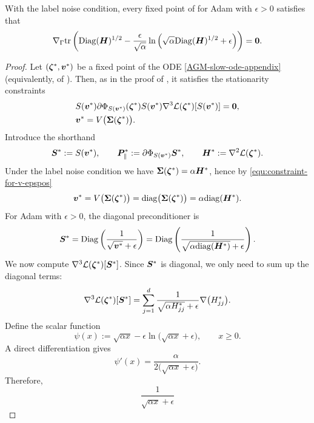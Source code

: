 \begin{lemma}\label{lemma:adam-implicit-bias-label-noise-eps-not-0}
    With the label noise condition, every fixed point of  for Adam with $\epsilon > 0$ satisfies that
    $$\nabla_{\Gamma} \text{tr}\left( \mathrm{Diag}({\bm{H}})^{1/2} - \frac{\epsilon}{\sqrt{\alpha}} \ln\left(\sqrt{\alpha}\mathrm{Diag}({\bm{H}})^{1/2} + \epsilon\right) \right) = {\bm{0}}.$$\label{thm:formal-adam-implicit-bias-label-noise-eps-not-0}
\end{lemma}
\begin{proof}
    Let $({\bm{\zeta}}^*,{\bm{v}}^*)$ be a fixed point of the ODE \eqref{AGM-slow-ode-appendix} (equivalently, of ). Then, as in the proof of , it satisfies the stationarity constraints
    \begin{align}
        &S({\bm{v}}^*) \partial\Phi_{S({\bm{v}}^*)} ({\bm{\zeta}}^*)  S({\bm{v}}^*)  \nabla^3 \mathcal{L} ({\bm{\zeta}}^*)[S({\bm{v}}^*)]={\bm{0}}, \label{equ:constraint-for-Phi-epspos}\\
        &{\bm{v}}^* = V\big({\bm{\Sigma}}({\bm{\zeta}}^*)\big). \label{equ:constraint-for-v-epspos}
    \end{align}
    Introduce the shorthand
    \[
        {\bm{S}}^* := S({\bm{v}}^*),\qquad
        {\bm{P}}^*_{\parallel}:=\partial \Phi_{S({\bm{v}}^*)}{\bm{S}}^*,\qquad
        {\bm{H}}^* := \nabla^2 \mathcal{L}({\bm{\zeta}}^*).
    \]
    Under the label noise condition we have ${\bm{\Sigma}}({\bm{\zeta}}^*)=\alpha{\bm{H}}^*$, hence by \eqref{equ:constraint-for-v-epspos}
    \[
        {\bm{v}}^* = V\big({\bm{\Sigma}}({\bm{\zeta}}^*)\big) = \mathrm{diag}\big({\bm{\Sigma}}({\bm{\zeta}}^*)\big)
        = \alpha\mathrm{diag}({\bm{H}}^*).
    \]
    For Adam with $\epsilon>0$, the diagonal preconditioner is
    \[
        {\bm{S}}^* = \mathrm{Diag}\left(\frac{1}{\sqrt{{\bm{v}}^*}+\epsilon}\right)
        = \mathrm{Diag}\left(\frac{1}{\sqrt{\alpha\mathrm{diag}({\bm{H}}^*)}+\epsilon}\right).
    \]
    We now compute $\nabla^3 \mathcal{L}({\bm{\zeta}}^*)[{\bm{S}}^*]$. Since ${\bm{S}}^*$ is diagonal, we only need to sum up the diagonal terms:
    \begin{align}
        \nabla^3 \mathcal{L}({\bm{\zeta}}^*)[{\bm{S}}^*]
        = \sum_{j=1}^{d} \frac{1}{\sqrt{\alpha H^*_{jj}}+\epsilon}\nabla\big(H^*_{jj}\big).
        \label{equ:epspos-first-line}
    \end{align}
    Define the scalar function
    \[
        \psi(x)
        := \sqrt{\alpha x}-\epsilon\ln\big(\sqrt{\alpha x}+\epsilon\big), \qquad x\ge 0.
    \]
    A direct differentiation gives
    \[
        \psi'(x)
        = \frac{\alpha}{2\big(\sqrt{\alpha x}+\epsilon\big)}.
    \]
    Therefore,
    \[
        \frac{1}{\sqrt{\alpha x}+\epsilon}
\]
\end{proof}
